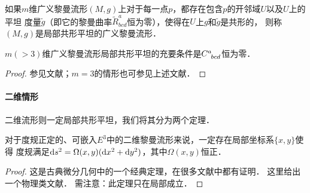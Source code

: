 \begin{definition}
    如果$m$维广义黎曼流形$(M,g)$上对于每一点$p$，都存在包含$p$的开邻域$U$以及$U$上的平坦
    度量$\tilde{g}$（即它的黎曼曲率$\tilde{R}^a_{bcd}$恒为零），使得在$U$上$g$和$\tilde{g}$是共形的，
    则称$(M,g)$是局部{\heiti 共形平坦}的广义黎曼流形．
\end{definition}

\begin{theorem}\label{chrg:thm_conformal-flat}
    $m(>3)$维广义黎曼流形局部共形平坦的充要条件是$C^a_{\hphantom{a} bcd}$恒为零．
\end{theorem}
\begin{proof}
    参见文献\parencite[\S 28]{eisenhart-1997-rg}；$m=3$的情形也可参见上述文献．
\end{proof}

\paragraph{二维情形} 二维流形则一定局部共形平坦，我们将其分为两个定理．

\begin{proposition}\label{chrg:thm_exist-oth-coord}
	对于度规正定的、可嵌入$E^3$中的二维黎曼流形来说，一定存在局部坐标系$\{x,y\}$使得
	度规满足${\rm d}s^2= \Omega(x,y)({\rm d}x^2 + {\rm d}y^2)$，其中$\Omega(x,y)$恒正．
\end{proposition}
\begin{proof}
	这是古典微分几何中的一个经典定理，在很多文献中都有证明．
	这里给出一个物理类文献\parencite[\S 11]{chandrasekhar-1983}．
	需注意：此定理只在{\kaishu 局部}成立．   
\end{proof}


